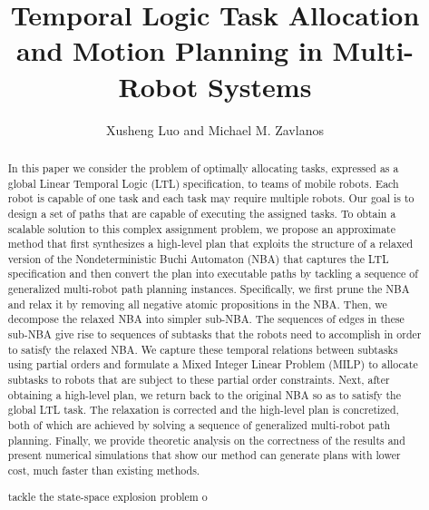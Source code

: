 \documentclass[Afour,sageh,times]{sagej}
\begin{document}

\author{Xusheng Luo and Michael M. Zavlanos}




\title{Temporal Logic Task Allocation and Motion Planning in Multi-Robot Systems}

\begin{abstract}
  In this paper we consider the problem of optimally allocating tasks, expressed as a global Linear Temporal Logic (LTL) specification, to teams of mobile robots. Each robot is capable of one task and each task may require multiple robots. Our goal is to design a set of  paths that are capable of executing the assigned tasks.
  To obtain a scalable solution to this complex assignment problem, we propose an approximate method that first synthesizes a high-level plan  that exploits the structure of a relaxed version of the Nondeterministic Buchi Automaton (NBA) that captures the LTL specification and then convert the plan into executable paths by tackling a sequence of generalized multi-robot path planning instances. Specifically, we first prune the NBA and relax it by removing all negative atomic propositions in the NBA. Then, we decompose the relaxed NBA into simpler sub-NBA. The sequences of edges in these sub-NBA give rise to sequences of subtasks that the robots need to accomplish in order to satisfy the relaxed NBA. We capture these temporal relations between subtasks using partial orders and formulate a Mixed Integer Linear Problem (MILP) to allocate subtasks to robots that are subject to these partial order constraints. Next, after obtaining a high-level plan, we return back to the original NBA so as to satisfy the global LTL task. The relaxation is corrected and the high-level plan is concretized, both of which are achieved by solving a sequence of generalized multi-robot path planning. Finally, we provide theoretic analysis on the correctness of the results and present numerical simulations that show our method can generate plans with lower cost, much faster than existing methods.

   tackle the state-space explosion problem o
\end{abstract}
\end{document}
